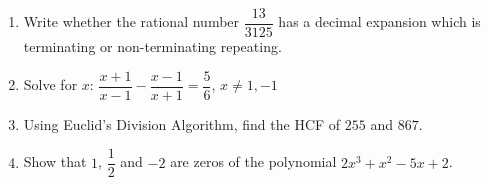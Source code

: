 \begin{enumerate}
\item Write whether the rational number $\dfrac{13}{3125}$ has a decimal expansion which is terminating or non-terminating repeating.
\item Solve for $x$: $\dfrac{x+1}{x-1}-\dfrac{x-1}{x+1}=\dfrac{5}{6}$, $x \neq 1, -1$
\item Using Euclid's Division Algorithm, find the HCF of $255$ and $867$.
\item Show that $1$, $\dfrac{1}{2}$ and $-2$ are zeros of the polynomial  $2x^{3}+x^{2}-5x+2$.
\end{enumerate}
